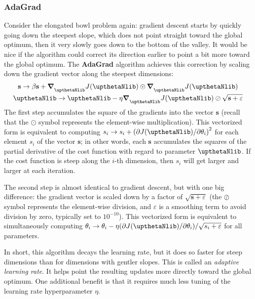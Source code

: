 \subsubsection{AdaGrad}
Consider the elongated bowl problem again: gradient descent starts by quickly going down the steepest slope, which does not point straight toward the global optimum, then it very slowly goes down to the bottom of the valley. It would be nice if the algorithm could correct its direction earlier to point a bit more toward the global optimum. The \textbf{AdaGrad} algorithm achieves this correction by scaling down the gradient vector along the steepest dimensions:
\begin{gather}
\mathbf{s}\rightarrow\beta\mathbf{s}+\boldsymbol{\nabla}_{\boldtheta}J(\boldtheta)\odot\boldsymbol{\nabla}_{\boldtheta}J(\boldtheta)\\
\boldtheta\rightarrow\boldtheta-\eta\boldsymbol{\nabla}_{\boldtheta}J(\boldtheta)\oslash\sqrt{\mathbf{s}+\varepsilon}
\end{gather}
The first step accumulates the square of the gradients into the vector $\mathbf{s}$ (recall that the $\odot$ symbol represents the element-wise multiplication). This vectorized form is equivalent to computing $s_i\rightarrow s_i+{(\partial J(\boldtheta)/\partial\theta_i)}^2$ for each element $s_i$ of the vector $\mathbf{s}$; in other words, each $\mathbf{s}$ accumulates the squares of the partial derivative of the cost function with regard to parameter $\boldtheta$. If the cost function is steep along the $i$-th dimension, then $s_i$ will get larger and larger at each iteration.

The second step is almost identical to gradient descent, but with one big difference: the gradient vector is scaled down by a factor of $\sqrt{\mathbf{s}+\varepsilon}$ (the $\oslash$ symbol represents the element-wise division, and $\varepsilon$ is a smoothing term to avoid division by zero, typically set to $10^{-10}$). This vectorized form is equivalent to simultaneously computing $\theta_i\rightarrow\theta_i-\eta(\partial J(\boldtheta)/\partial\theta_i)/\sqrt{s_i+\varepsilon}$ for all parameters.

In short, this algorithm decays the learning rate, but it does so faster for steep dimensions than for dimensions with gentler slopes. This is called an \emph{adaptive learning rate}. It helps point the resulting updates more directly toward the global optimum. One additional benefit is that it requires much less tuning of the learning rate hyperparameter $\eta$.

